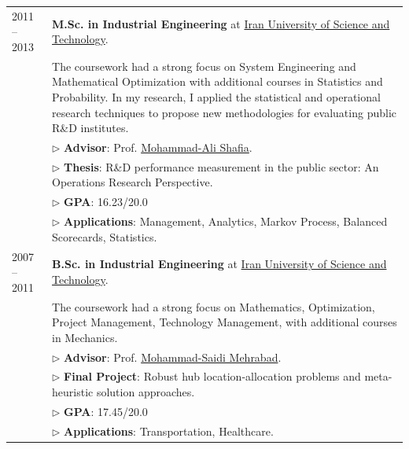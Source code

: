\documentclass[10PT,letter]{article}
\begin{document}
\begin{tabular}{lp{5.5in}}
	            \textsc{2011 -- 2013} & \textbf{M.Sc. in Industrial Engineering} at \href{http://www.iust.ac.ir/en}{Iran University of Science and Technology}.\\[.5mm]
	            & The coursework had a strong focus on System Engineering and Mathematical Optimization with additional courses in Statistics and Probability. In my research, I applied the statistical and operational research techniques  to propose new methodologies for evaluating  public R\&D institutes.\\[.5mm]
	            & $\triangleright$ {\small\textbf{Advisor}}:  Prof. \href{https://scholar.google.com/citations?hl=en\&user=GV4tnu4AAAAJ\&view_op=list_works\&sortby=pubdate}{Mohammad-Ali Shafia}.\\[1.1mm]
	            & $\triangleright$ {\small\textbf{Thesis}}: R\&D performance measurement in the public sector: An Operations Research Perspective.\\
	            & $\triangleright$ {\small\textbf{GPA}}: 16.23/20.0\\
	            & $\triangleright$ {\small\textbf{Applications}}: Management, Analytics, Markov Process, Balanced Scorecards, Statistics.\\[4mm]
				\textsc{2007 -- 2011} & \textbf{B.Sc. in Industrial Engineering} at \href{http://www.iust.ac.ir/en}{Iran University of Science and Technology}.\\[.5mm]
				& The coursework had a strong focus on Mathematics, Optimization, Project Management, Technology Management,  with additional courses in Mechanics. \\[.5mm]
				& $\triangleright$ {\small\textbf{Advisor}}:  Prof. \href{http://ie.iust.ac.ir/page.php?slct_pg_id=5442\&sid=61\&slc_lang=en}{Mohammad-Saidi Mehrabad}.\\[1.1mm]
				& $\triangleright$ {\small\textbf{Final Project}}: Robust hub location-allocation problems and meta-heuristic solution approaches.\\
				& $\triangleright$ {\small\textbf{GPA}}: 17.45/20.0\\
				& $\triangleright$ {\small\textbf{Applications}}:  Transportation, Healthcare.
        \end{tabular}
\end{document}
